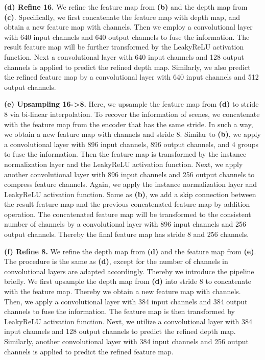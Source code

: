 \documentclass{article} \usepackage{iclr2023_conference, times}
\newcommand{\formattedparagraph}[1]{\noindent \textbf{#1}}
\begin{document}
\formattedparagraph{(d) Refine 16.}
We refine the feature map from \textbf{(b)} and the depth map from \textbf{(c)}. Specifically, we first concatenate the feature map with depth map, and obtain a new feature map with  channels. Then we employ a convolutional layer with 640 input channels and 640 output channels to fuse the information. The result feature map will be further transformed by the LeakyReLU activation function. Next a convolutional layer with 640 input channels and 128 output channels is applied to predict the refined depth map. Similarly, we also predict the refined feature map by a convolutional layer with 640 input channels and 512 output channels. 

\formattedparagraph{(e) Upsampling 16->8.} Here, we upsample the feature map from \textbf{(d)} to stride 8 via bi-linear interpolation. To recover the information of scenes, we concatenate with the feature map from the encoder that has the same stride. In such a way, we obtain a new feature map with  channels and stride 8. Similar to \textbf{(b)}, we apply a convolutional layer with 896 input channels, 896 output channels, and 4 groups to fuse the information. Then the feature map is transformed by the instance normalization layer and the LeakyReLU activation function. Next, we apply another convolutional layer with 896 input channels and 256 output channels to compress feature channels. Again, we apply the instance normalization layer and LeakyReLU activation function. Same as \textbf{(b)}, we add a skip connection between the result feature map and the previous concatenated feature map by addition operation. The concatenated feature map will be transformed to the consistent number of channels by a convolutional layer with 896 input channels and 256 output channels. Thereby the final feature map has stride 8 and 256 channels.

\formattedparagraph{(f) Refine 8.} We refine the depth map from \textbf{(d)} and the feature map from \textbf{(e)}. The procedure is the same as \textbf{(d)}, except for the number of channels in convolutional layers are adapted accordingly. Thereby we introduce the pipeline briefly. We first upsample the depth map from \textbf{(d)} into stride 8 to concatenate with the feature map. Thereby we obtain a new feature map with  channels. Then, we apply a convolutional layer with 384 input channels and 384 output channels to fuse the information. The feature map is then transformed by LeakyReLU activation function. Next, we utilize a convolutional layer with 384 input channels and 128 output channels to predict the refined depth map. Similarly, another convolutional layer with 384 input channels and  256 output channels is applied to predict the refined feature map.
\end{document}
